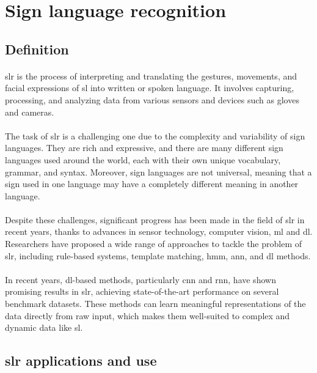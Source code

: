\section{Sign language recognition}
\subsection{Definition}
\paragraph{}
\ac{slr} is the process of interpreting and translating the gestures, movements, and facial expressions of \ac{sl} into written or spoken language. It involves capturing, processing, and analyzing data from various sensors and devices such as gloves and cameras.
\paragraph{}
The task of \ac{slr} is a challenging one due to the complexity and variability of sign languages. They are rich and expressive, and there are many different sign languages used around the world, each with their own unique vocabulary, grammar, and syntax. Moreover, sign languages are not universal, meaning that a sign used in one language may have a completely different meaning in another language.
\paragraph{}
Despite these challenges, significant progress has been made in the field of \ac{slr} in recent years, thanks to advances in sensor technology, computer vision, \ac{ml} and \ac{dl}. Researchers have proposed a wide range of approaches to tackle the problem of \ac{slr}, including rule-based systems, template matching, \ac{hmm}, \ac{ann}, and \ac{dl} methods.
\paragraph{}
In recent years, \ac{dl}-based methods, particularly \ac{cnn} and \ac{rnn}, have shown promising results in \ac{slr}, achieving state-of-the-art performance on several benchmark datasets. These methods can learn meaningful representations of the data directly from raw input, which makes them well-suited to complex and dynamic data like \ac{sl}.
\subsection{\ac{slr} applications and use}
